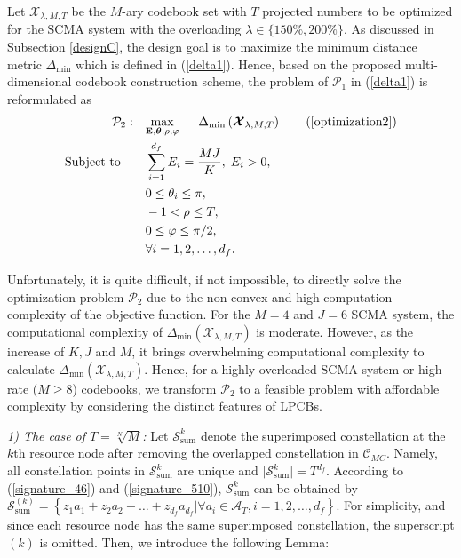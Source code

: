\documentclass[journal]{IEEEtran}
\begin{document}
Let $ \boldsymbol {\mathcal X}_{\lambda, M, T} $ be the $M$-ary codebook set  with  $T$ projected numbers  to be optimized for the SCMA system with the overloading  $\lambda \in \{ 150\%, 200\% \}$. As discussed in Subsection \ref{designC}, the design goal is to maximize the minimum distance metric    $\Delta_{\min}$   which is defined in  (\ref{delta1}).  Hence,  based on the proposed multi-dimensional codebook construction scheme, the  problem of $ \mathcal {P}_1 $ in (\ref{delta1}) is  reformulated as
 \begin{subequations}
\label{optimization2}
 \small
\begin{align}
\mathcal {P}_2: \quad   & \underset{\mathbf{E},\boldsymbol{\theta }, \rho,\varphi  }{\mathop{\max }}\quad    \; \; \Delta_{\min}\left( {   \boldsymbol {\mathcal X}_{\lambda,M,T}}\right) \tag{\ref{optimization2}}\\
\text {Subject to}  \quad \quad   
&\sum\limits_{i=1}^{{{d}_{f}}}{{{E}_{i}}}=\frac{MJ}{K},\;  {{E}_{i}} >0, \label{optimization2:a}\\
& 0 \le {{\theta }_{i}}\le \pi, \label{optimization2:b}\\
 &     -1  < \rho \le T, \label{optimization2:c}\\
&   0 \le  \varphi \le {\pi}/2, \label{optimization2:d}\\
 & \forall i=1,2,\ldots ,{{d}_{f}}.
\end{align}
\end{subequations}

Unfortunately, it is quite difficult, if not impossible, to directly solve
the optimization problem $ \mathcal {P}_2$ due to the non-convex and high computation complexity of the objective function.   For the $M=4$ and $J=6$ SCMA system, the computational complexity of $ \Delta_{\min}\left( {   \boldsymbol {\mathcal X}_{\lambda,M,T}      }\right)$ is moderate. However, as the increase of $K,J$ and $M$, it brings overwhelming computational complexity to calculate $ \Delta_{\min}\left( {   \boldsymbol {\mathcal X}_{\lambda,M,T}      }\right)$. Hence, for a highly overloaded SCMA system or high rate ($M \geq 8$) codebooks,   we   transform $ \mathcal {P}_2$ to a  feasible problem  with affordable  complexity by considering the distinct features of LPCBs. 

\textit{ 1) The case of $T={\sqrt[N]{M}} $:}   Let $\boldsymbol{\mathcal S}_{\text{sum}}^{k}$ denote   the superimposed constellation  at the $k$th resource node after removing the overlapped constellation in    $\boldsymbol {\mathcal C}_{MC}$. Namely,  all constellation points in  $ \boldsymbol{\mathcal S}_{\text{sum}}^{k}$ are unique and $\vert  \boldsymbol{\mathcal S}_{\text{sum}}^{k} \vert = T^{d_f}$. According to  (\ref{signature_46}) and (\ref{signature_510}),  $\boldsymbol{\mathcal S}_{\text{sum}}^{k}$  can be obtained by  $\boldsymbol{\mathcal S}_{\text{sum}}^{(k)} = \left\{ z_1a_1 + z_2a_2 + \ldots  + z_{d_f}a_{d_f} \vert \forall a_i\in  \mathcal{A}_{T}, i =1,2,\ldots,d_f \right\}$.
For simplicity, and since each resource node has the same superimposed constellation, the superscript $(k)$ is omitted.
Then, we introduce the following Lemma:
\end{document}
